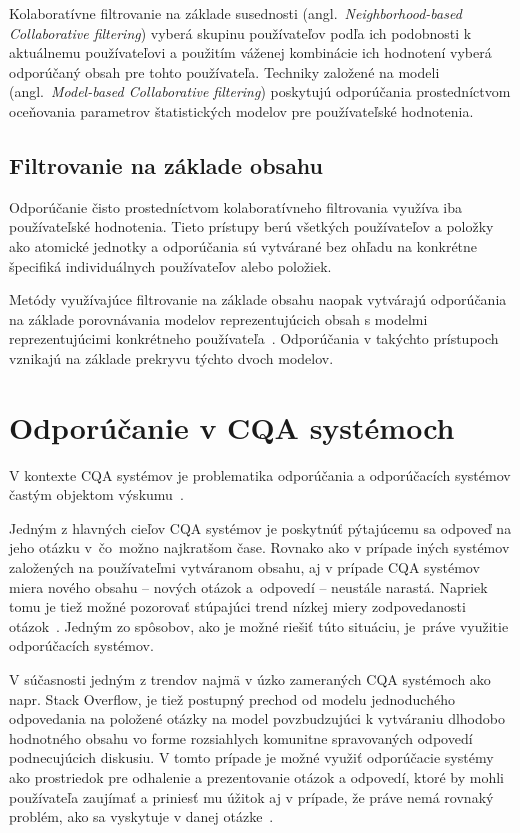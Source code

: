 Kolaboratívne filtrovanie na základe susednosti (angl.~\emph{Neighborhood-based Collaborative filtering})
vyberá skupinu používateľov podľa ich podobnosti k aktuálnemu používateľovi
a použitím váženej kombinácie ich hodnotení vyberá odporúčaný obsah pre tohto používateľa.
Techniky založené na modeli (angl.~\emph{Model-based Collaborative filtering}) poskytujú odporúčania prostedníctvom
oceňovania parametrov štatistických modelov pre používateľské hodnotenia.

\subsection{Filtrovanie na základe obsahu}\label{rec:content}

Odporúčanie čisto prostedníctvom kolaboratívneho filtrovania využíva iba používateľské hodnotenia. Tieto prístupy berú
všetkých používateľov a položky ako atomické jednotky a odporúčania sú vytvárané bez ohľadu na konkrétne špecifiká
individuálnych používateľov alebo položiek.

Metódy využívajúce filtrovanie na základe obsahu naopak vytvárajú
odporúčania na základe porovnávania modelov reprezentujúcich obsah s modelmi reprezentujúcimi konkrétneho používateľa~\cite{Handbook2011}.
Odporúčania v takýchto prístupoch vznikajú na základe prekryvu týchto dvoch modelov.


\section{Odporúčanie v CQA systémoch}

V kontexte CQA systémov je problematika odporúčania a odporúčacích systémov častým objektom výskumu~\cite{Srba2016}.

Jedným z hlavných cieľov CQA systémov je poskytnúť pýtajúcemu sa odpoveď na jeho otázku v~čo~možno najkratšom čase.
Rovnako ako v prípade iných systémov založených na používateľmi vytváranom obsahu, aj v prípade CQA systémov miera
nového obsahu -- nových otázok a~odpovedí -- neustále narastá. Napriek tomu je tiež možné pozorovať stúpajúci trend
nízkej miery zodpovedanosti otázok~\cite{Srba2016SOFail}. Jedným zo spôsobov, ako je možné riešiť túto situáciu,
je~práve využitie odporúčacích systémov.

V súčasnosti jedným z trendov najmä v úzko zameraných CQA systémoch ako napr. Stack Overflow, je tiež postupný prechod
od modelu jednoduchého odpovedania na položené otázky na model povzbudzujúci k vytváraniu dlhodobo hodnotného obsahu
vo forme rozsiahlych komunitne spravovaných odpovedí~\cite{Anderson2012,Li2015} podnecujúcich diskusiu.
V tomto prípade je možné využiť odporúčacie systémy ako prostriedok pre odhalenie a prezentovanie otázok a odpovedí,
ktoré by mohli používateľa zaujímať a priniesť mu úžitok aj v prípade, že práve nemá rovnaký problém,
ako sa vyskytuje v danej otázke~\cite{Toba2014}.

